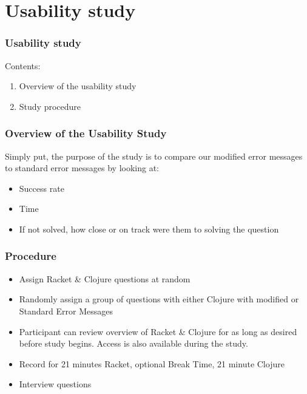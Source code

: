 \documentclass{beamer}
\begin{document}
\section{Usability study}

\begin{frame}
  \frametitle{Usability study}
Contents:
\begin{enumerate}
\item Overview of the usability study 
\item Study procedure
\end{enumerate}
\end{frame}


\begin{frame}
  \frametitle{Overview of the Usability Study}
Simply put, the purpose of the study is to compare our modified error messages to standard error messages by looking at:
\begin{itemize}
\item Success rate
\item Time
\item If not solved, how close or on track were them to solving the question
\end{itemize} 
\end{frame}




\begin{frame}
  \frametitle{Procedure}
\begin{itemize}

\item Assign Racket \& Clojure questions at random
\item Randomly assign a group of questions with either Clojure with modified or Standard Error Messages
\item Participant can review overview of Racket \& Clojure for as long as desired before study begins. Access is also available during the study.
\item Record for 21 minutes Racket, optional Break Time, 21 minute Clojure
\item Interview questions
  
\end{itemize}  
\end{frame}
\end{document}

